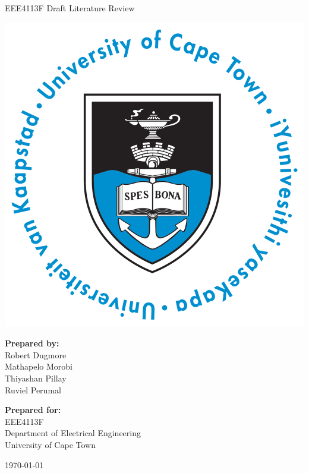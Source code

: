 \thispagestyle{empty}
\begin{center}
    
\Huge

\vspace{5cm}

EEE4113F Draft Literature Review

\vspace{2.5cm}

\includegraphics[width=0.4\linewidth]{FrontMatter/UCT_logo.png}

\vfill

\large
\textbf{Prepared by:}\\
Robert Dugmore\\
Mathapelo Morobi\\
Thiyashan Pillay\\
Ruviel Perumal

\vspace{1cm}

\textbf{Prepared for:}\\
EEE4113F\\
Department of Electrical Engineering\\
University of Cape Town

\vspace{2cm}

\today


\end{center}